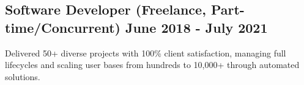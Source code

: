\subsection{{Software Developer (Freelance, Part-time/Concurrent) \hfill June 2018 - July 2021}}
\begin{zitemize}
\item Delivered 50+ diverse projects with 100\% client satisfaction, managing full lifecycles and scaling user bases from hundreds to 10,000+ through automated solutions.
\end{zitemize}
